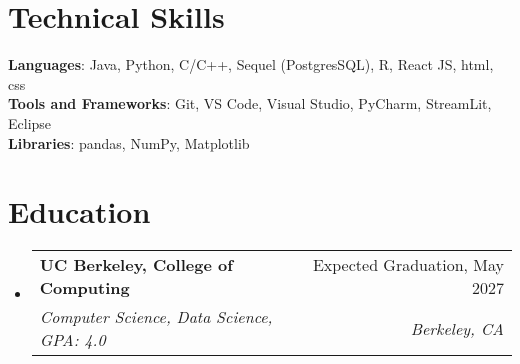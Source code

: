 \documentclass[letterpaper,11pt]{article}
\makeatletter
\newcommand{\resumeItem}[1]{
  \item\small{
    {#1 \vspace{-2pt}}
  }
}
\newcommand{\resumeSubheading}[4]{
  \vspace{-2pt}\item
    \begin{tabular*}{0.97\textwidth}[t]{l@{\extracolsep{\fill}}r}
      \textbf{#1} & #2 \\
      \textit{\small#3} & \textit{\small #4} \\
    \end{tabular*}\vspace{-7pt}
}
\newcommand{\resumeSubHeadingListStart}{\begin{itemize}[leftmargin=0.15in, label={}]}
\newcommand{\resumeSubHeadingListEnd}{\end{itemize}}
\newcommand{\resumeItemListStart}{\begin{itemize}}
\newcommand{\resumeItemListEnd}{\end{itemize}\vspace{-5pt}}
\makeatother
\begin{document}
\section{Technical Skills}
 \begin{itemize}[leftmargin=0.15in, label={}]
    \small{\item{
     \textbf{Languages}{: Java, Python, C/C++, Sequel (PostgresSQL), R, React JS, html, css} \\
     \textbf{Tools and Frameworks}{: Git, VS Code, Visual Studio, PyCharm, StreamLit, Eclipse} \\
     \textbf{Libraries}{: pandas, NumPy, Matplotlib}
    }}
 \end{itemize}


\section{Education}
  \resumeSubHeadingListStart
    \resumeSubheading
      {UC Berkeley, College of Computing}{Expected Graduation, May 2027}
    {Computer Science, Data Science, GPA: 4.0}{Berkeley, CA}
    

  \resumeSubHeadingListEnd
\fancyfoot[C]{\textcolor{red}{\tiny footnote here}}
\end{document}
